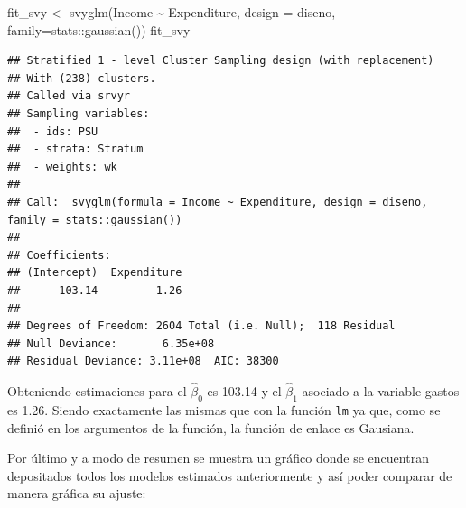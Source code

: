 \documentclass[
  12pt,
]{book}
\newenvironment{Shaded}{\begin{snugshade}}{\end{snugshade}}
\newcommand{\AttributeTok}[1]{\textcolor[rgb]{0.77,0.63,0.00}{#1}}
\newcommand{\FunctionTok}[1]{\textcolor[rgb]{0.00,0.00,0.00}{#1}}
\newcommand{\NormalTok}[1]{#1}
\newcommand{\OtherTok}[1]{\textcolor[rgb]{0.56,0.35,0.01}{#1}}
\newcommand{\SpecialCharTok}[1]{\textcolor[rgb]{0.00,0.00,0.00}{#1}}
\begin{document}
\begin{Shaded}
\begin{Highlighting}[]
\NormalTok{fit\_svy }\OtherTok{\textless{}{-}} \FunctionTok{svyglm}\NormalTok{(Income }\SpecialCharTok{\textasciitilde{}}\NormalTok{ Expenditure, }
                  \AttributeTok{design =}\NormalTok{ diseno, }\AttributeTok{family=}\NormalTok{stats}\SpecialCharTok{::}\FunctionTok{gaussian}\NormalTok{())}
\NormalTok{fit\_svy}
\end{Highlighting}
\end{Shaded}

\begin{verbatim}
## Stratified 1 - level Cluster Sampling design (with replacement)
## With (238) clusters.
## Called via srvyr
## Sampling variables:
##  - ids: PSU
##  - strata: Stratum
##  - weights: wk
## 
## Call:  svyglm(formula = Income ~ Expenditure, design = diseno, family = stats::gaussian())
## 
## Coefficients:
## (Intercept)  Expenditure  
##      103.14         1.26  
## 
## Degrees of Freedom: 2604 Total (i.e. Null);  118 Residual
## Null Deviance:       6.35e+08 
## Residual Deviance: 3.11e+08  AIC: 38300
\end{verbatim}

Obteniendo estimaciones para el \(\hat{\beta}_{0}\) es 103.14 y el \(\hat{\beta}_{1}\) asociado a la variable gastos es 1.26. Siendo exactamente las mismas que con la función \texttt{lm} ya que, como se definió en los argumentos de la función, la función de enlace es Gausiana.

Por último y a modo de resumen se muestra un gráfico donde se encuentran depositados todos los modelos estimados anteriormente y así poder comparar de manera gráfica su ajuste:
\end{document}
